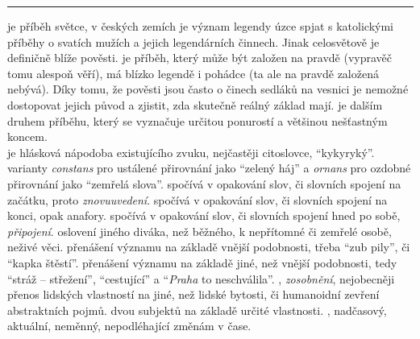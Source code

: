 \documentclass[FGBook.tex]{subfiles}
\begin{document}
\noindent\begin{minipage}{\textwidth}
    {\textcolor{\wpagecolor}{\rule{\linewidth}{0.4pt}}
    \footnotesize
     je příběh světce, v českých zemích je význam legendy úzce spjat s katolickými příběhy o svatích mužích a jejich legendárních činnech. Jinak celosvětově je definičně blíže pověsti.
     je příběh, který může být založen na pravdě (vypravěč tomu alespoň věří), má blízko legendě i pohádce (ta ale na pravdě založená nebývá). Díky tomu, že pověsti jsou často o činech sedláků na vesnici je nemožné dostopovat jejich původ a zjistit, zda skutečně reálný základ mají.
     je dalším druhem příběhu, který se vyznačuje určitou ponurostí a většinou nešťastným koncem. \\
     je hlásková nápodoba existujícího zvuku, nejčastěji citoslovce, \enquote{kykyryký}.
     varianty \textit{constans} pro ustálené přirovnání jako \enquote{zelený háj} a \textit{ornans} pro ozdobné přirovnání jako \enquote{zemřelá slova}.
     spočívá v opakování slov, či slovních spojení na začátku, proto \textit{znovuuvedení}.
     spočívá v opakování slov, či slovních spojení na konci, opak anafory.
     spočívá v opakování slov, či slovních spojení hned po sobě, \textit{připojení}.
     oslovení jiného diváka, než běžného, k nepřítomné či zemřelé osobě, neživé věci.
     přenášení významu na základě vnější podobnosti, třeba \enquote{zub pily}, či \enquote{kapka štěstí}.
     přenášení významu na základě jiné, než vnější podobnosti, tedy \enquote{stráž -- střežení}, \enquote{cestující} a \enquote{\textit{Praha} to neschválila}.
    , \textit{zosobnění}, nejobecněji přenos lidských vlastností na jiné, než lidské bytosti, či humanoidní zevření abstraktních pojmů.
     dvou subjektů na základě určité vlastnosti.
    , nadčasový, aktuální, neměnný, nepodléhající změnám v čase.
    }
\end{minipage}

\newpage
\end{document}
